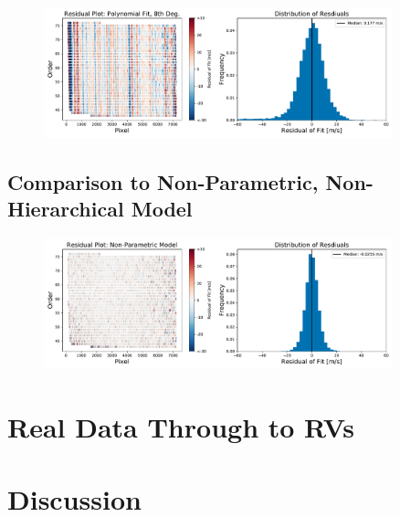 \documentclass[12pt, letterpaper]{article}
\begin{document}
\begin{figure}[h]
\centering
\includegraphics[width=0.9\textwidth]{Figures/designMatrix.pdf}
\caption{}
\label{fig:dsnMFit}
\end{figure} 

\subsection{Comparison to Non-Parametric, Non-Hierarchical Model}

\begin{figure}[h]
\centering
\includegraphics[width=0.9\textwidth]{Figures/noHierc.pdf}
\caption{}
\label{fig:intpFit}
\end{figure} 

\section{Real Data Through to RVs} \label{sec:realdata}

\section{Discussion} \label{sec:discussion}
\end{document}
